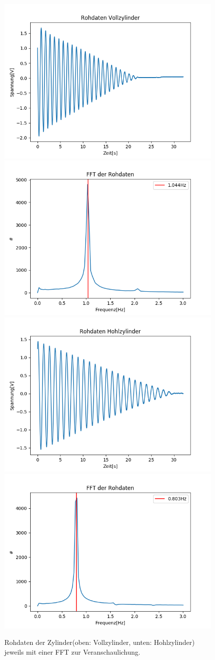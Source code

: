 \documentclass[12pt,a4paper]{article}
\begin{document}
\begin{figure}
\includegraphics[width=0.49\linewidth]{Bilder/Voll_Rohdaten.PNG}
\includegraphics[width=0.49\linewidth]{Bilder/Voll_FFT.PNG}
\includegraphics[width=0.49\linewidth]{Bilder/Hohl_Rohdaten.PNG}
\includegraphics[width=0.49\linewidth]{Bilder/Hohl_FFT.PNG}
\caption{Rohdaten der Zylinder(oben: Vollzylinder, unten: Hohlzylinder) jeweils mit einer FFT zur Veranschaulichung.}
\label{fig:Zylinder_Rohdaten}
\end{figure}
\end{document}
